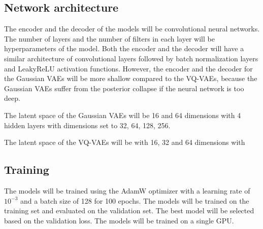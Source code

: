 \subsection{Network architecture}

The encoder and the decoder of the models will be convolutional neural networks. The number of layers and the number of filters in each layer will be hyperparameters of the model. Both the encoder and the decoder will have a similar architecture of convolutional layers followed by batch normalization layers and LeakyReLU activation functions. However, the encoder and the decoder for the Gaussian VAEs will be more shallow compared to the VQ-VAEs, because the Gaussian VAEs suffer from the posterior collapse if the neural network is too deep. 

The latent space of the Gaussian VAEs will be 16 and 64 dimensions with 4 hidden layers with dimensions set to 32, 64, 128, 256. 

The latent space of the VQ-VAEs will be with 16, 32 and 64 dimensions with 

\subsection{Training}

The models will be trained using the AdamW optimizer with a learning rate of $10^{-3}$ and a batch size of 128 for 100 epochs. The models will be trained on the training set and evaluated on the validation set. The best model will be selected based on the validation loss. The models will be trained on a single GPU.